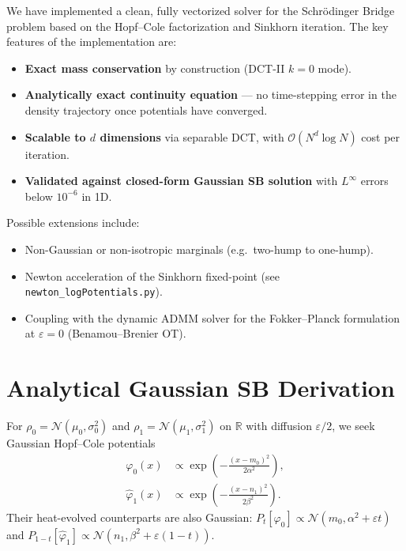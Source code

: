 \documentclass[11pt,a4paper]{article}
\newcommand{\eps}{\varepsilon}
\newcommand{\R}{\mathbb{R}}
\newcommand{\calN}{\mathcal{N}}
\newcommand{\Pt}[1]{P_{#1}}   %
\begin{document}
We have implemented a clean, fully vectorized solver for the Schr\"{o}dinger
Bridge problem based on the Hopf--Cole factorization and Sinkhorn iteration.
The key features of the implementation are:

\begin{itemize}
  \item \textbf{Exact mass conservation} by construction (DCT-II $k=0$ mode).
  \item \textbf{Analytically exact continuity equation} — no time-stepping error
        in the density trajectory once potentials have converged.
  \item \textbf{Scalable to $d$ dimensions} via separable DCT, with
        $\mathcal{O}(N^d \log N)$ cost per iteration.
  \item \textbf{Validated against closed-form Gaussian SB solution}
        with $L^\infty$ errors below $10^{-6}$ in 1D.
\end{itemize}

Possible extensions include:
\begin{itemize}
  \item Non-Gaussian or non-isotropic marginals (e.g.\ two-hump to one-hump).
  \item Newton acceleration of the Sinkhorn fixed-point
        (see \texttt{newton\_logPotentials.py}).
  \item Coupling with the dynamic ADMM solver for the Fokker--Planck
        formulation at $\eps = 0$ (Benamou--Brenier OT).
\end{itemize}

\appendix
\section{Analytical Gaussian SB Derivation}
\label{app:gaussian}

For $\rho_0 = \calN(\mu_0,\sigma_0^2)$ and $\rho_1 = \calN(\mu_1,\sigma_1^2)$
on $\R$ with diffusion $\eps/2$, we seek Gaussian Hopf--Cole potentials
\begin{align}
  \varphi_0(x) &\propto \exp\!\left(-\tfrac{(x-m_0)^2}{2\alpha^2}\right),\\
  \hat\varphi_1(x) &\propto \exp\!\left(-\tfrac{(x-n_1)^2}{2\beta^2}\right).
\end{align}
Their heat-evolved counterparts are also Gaussian:
$\Pt{t}[\varphi_0] \propto \calN(m_0, \alpha^2 + \eps t)$ and
$\Pt{1-t}[\hat\varphi_1] \propto \calN(n_1, \beta^2 + \eps(1-t))$.
\end{document}
